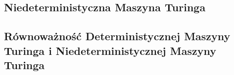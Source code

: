 \subsection{Niedeterministyczna Maszyna Turinga}


\subsection{Równoważność Deterministycznej Maszyny Turinga i Niedeterministycznej Maszyny Turinga}
